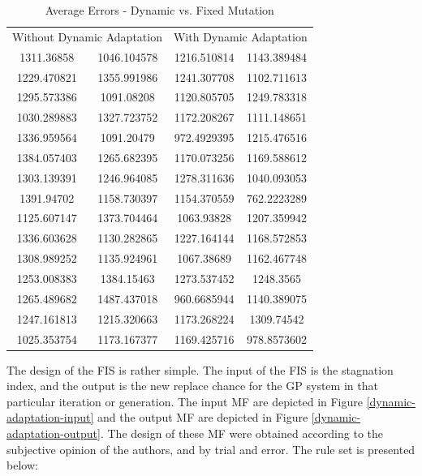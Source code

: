 \documentclass[12pt,journal,compsoc]{IEEEtran}
\begin{document}
\begin{table}
    \caption{{Average Errors - Dynamic vs. Fixed Mutation}}
    \label{dynamic-vs-non-dynamic-table}
    \begin{tabular}{ c c | c c}
        \multicolumn{2}{c}{Without Dynamic Adaptation} & \multicolumn{2}{c}{With Dynamic Adaptation} \\ 
         1311.36858  & 1046.104578 & 1216.510814 & 1143.389484 \\ 
         1229.470821 & 1355.991986 & 1241.307708 & 1102.711613 \\ 
         1295.573386 & 1091.08208  & 1120.805705 & 1249.783318 \\ 
         1030.289883 & 1327.723752 & 1172.208267 & 1111.148651 \\ 
         1336.959564 & 1091.20479  & 972.4929395 & 1215.476516 \\ 
         1384.057403 & 1265.682395 & 1170.073256 & 1169.588612 \\ 
         1303.139391 & 1246.964085 & 1278.311636 & 1040.093053 \\ 
         1391.94702  & 1158.730397 & 1154.370559 & 762.2223289 \\ 
         1125.607147 & 1373.704464 & 1063.93828  & 1207.359942 \\ 
         1336.603628 & 1130.282865 & 1227.164144 & 1168.572853 \\
         1308.989252 & 1135.924961 & 1067.38689  & 1162.467748 \\
         1253.008383 & 1384.15463  & 1273.537452 & 1248.3565   \\
         1265.489682 & 1487.437018 & 960.6685944 & 1140.389075 \\
         1247.161813 & 1215.320663 & 1173.268224 & 1309.74542  \\
         1025.353754 & 1173.167377 & 1169.425716 & 978.8573602 \\
    \end{tabular} 
\end{table}

The design of the FIS is rather simple. The input of the FIS is the stagnation index, and the output is the new replace chance for the GP system in that particular iteration or generation. The input MF are depicted in Figure \ref{dynamic-adaptation-input} and the output MF are depicted in Figure \ref{dynamic-adaptation-output}. The design of these MF were obtained according to the subjective opinion of the authors, and by trial and error. The rule set is presented below:
\end{document}
